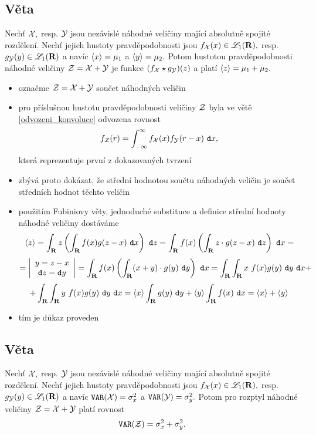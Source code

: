 \subsection{Věta}
Nechť ${\mathcal X},$ resp. ${\mathcal Y}$ jsou nezávislé náhodné veličiny maj\'ic\'i absolutn\v e spojit\'e rozd\v elen\'i. Nech\v t jejich hustoty pravděpodobnosti jsou $f_{\mathcal X}(x)\in{\mathscr L}_1({\mathbf R}),$ resp. $g_{\mathcal Y}(y)\in{\mathscr L}_1({\mathbf R})$ a nav\'ic $\langle x \rangle=\mu_1$ a
$\langle y \rangle=\mu_2.$ Potom hustotou pravděpodobnosti náhodné veličiny
${\mathcal{Z}}={\mathcal X}+{\mathcal Y}$ je funkce $(f_{\mathcal X} \star g_{\mathcal Y})(z)$ a platí $\langle z
\rangle=\mu_1+\mu_2.$\\

\Proof

\begin{itemize}
\item označme ${\mathcal{Z}}={\mathcal X}+{\mathcal Y}$ sou\v cet n\'ahodn\'ych veli\v cin

\item pro p\v r\'islu\v snou hustotu pravděpodobnosti veli\v ciny ${\mathcal{Z}}$ byla ve v\v et\v e \ref{odvozeni_konvoluce} odvozena rovnost $$f_{\mathcal{Z}}(r)= \int_{-\infty}^\infty f_{\mathcal X}(x)f_{\mathcal Y}(r-x)~\mathtt{d}x,$$ kter\'a reprezentuje prvn\'i z dokazovan\'ych tvrzen\'i

\item zb\'yv\'a proto dok\'azat, \v ze st\v redn\'i hodnotou sou\v ctu n\'ahodn\'ych veli\v cin je sou\v cet st\v redn\'ich hodnot t\v echto veli\v cin

\item použitím Fubiniovy věty, jednoduché substituce a definice střední hodnoty náhodné veličiny dostáváme
%
$$\langle z \rangle=\int_{{\mathbf R}}z\left(\int_{{\mathbf R}}f(x)g(z-x)~\mathtt{d}x\right)~\mathtt{d}z=\int_{\mathbf R}
f(x)\left(\int_{\mathbf R} z\cdot g(z-x)~\mathtt{d}z\right)~\mathtt{d}x=$$
%
$$=\left|\begin{array}{c} y=z-x\\ \mathtt{d}z=\mathtt{d}y \end{array}\right|= \int_{\mathbf R}
f(x)\left(\int_{\mathbf R} (x+y)\cdot g(y)~\mathtt{d}y\right)~\mathtt{d}x=\int_{\mathbf R}\int_{\mathbf R}
x~f(x)g(y)~\mathtt{d}y~\mathtt{d}x{}+$$
%
$$+\int_{\mathbf R}\int_{\mathbf R}
y~f(x)g(y)~\mathtt{d}y~\mathtt{d}x=\langle x\rangle\int_{{\mathbf R}} g(y)~\mathtt{d}y+\langle y \rangle\int_{{\mathbf R}}
f(x)~\mathtt{d}x=\langle x \rangle+\langle y \rangle$$

\item t\'im je d\r ukaz proveden

\end{itemize}

\subsection{Věta}
Nechť ${\mathcal X},$ resp. ${\mathcal Y}$ jsou nezávislé náhodné veličiny maj\'ic\'i absolutn\v e spojit\'e rozd\v elen\'i. Nech\v t jejich hustoty pravděpodobnosti jsou $f_{\mathcal X}(x)\in{\mathscr L}_1({\mathbf R}),$ resp. $g_{\mathcal Y}(y)\in{\mathscr L}_1({\mathbf R})$ a nav\'ic $\mathtt{VAR}({\mathcal X})=\sigma_x^2$ a
$\mathtt{VAR}({\mathcal Y})=\sigma_y^2.$ Potom pro rozptyl n\'ahodn\'e veli\v ciny ${\mathcal{Z}}={\mathcal X}+{\mathcal Y}$ plat\'i rovnost
%
$$\mathtt{VAR}({\mathcal{Z}})=\sigma_x^2+\sigma_y^2.$$

